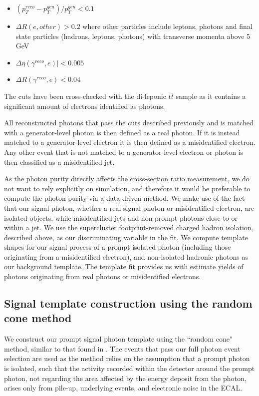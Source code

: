 \begin{itemize}
	\item $\left( p_T^{reco} - p_T^{gen} \right) /p_T^{gen} < 0.1$
	\item $\Delta R ( e, other ) > 0.2$ where other particles include leptons, photons and final state
		  particles (hadrons, leptons, photons) with transverse momenta above 5 GeV
	\item $ \Delta\eta ( \gamma^{reco}, e )| < 0.005$
	\item $\Delta R ( \gamma^{reco}, e ) < 0.04$
\end{itemize}

The cuts have been cross-checked with the di-leponic $t\bar{t}$ sample as it contains a significant amount of electrons identified as photons.

All reconstructed photons that pass the cuts described previously and is matched with a generator-level photon is then defined as a real photon. If it is instead matched to a generator-level electron it is then defined as a misidentified electron. Any other event that is not matched to a generator-level electron or photon is then classified as a misidentified jet.

As the photon purity directly affects the cross-section ratio measurement, we do not want to rely explicitly on simulation, and therefore it would be preferable to compute the photon purity via a data-driven method. We make use of the fact that our signal photon, whether a real signal photon or misidentified electron, are isolated objects, while misidentified jets and non-prompt photons close to or within a jet. We use the supercluster footprint-removed charged hadron isolation, described above, as our discriminating variable in the fit. We compute template shapes for our signal process of a prompt isolated photon (including those originating from a misidentified electron), and non-isolated hadronic photons as our background template. The template fit provides us with estimate yields of photons originating from real photons or misidentified electrons.   

\subsection{Signal template construction using the random cone method}

We construct our prompt signal photon template using the ``random cone" method, similar to that found in \cite{diffxsectdiphoton}. The events that pass our full photon event selection are used as the method relies on the assumption that a prompt photon is isolated, such that the activity recorded within the detector around the prompt photon, not regarding the area affected by the energy deposit from the photon, arises only from pile-up, underlying events, and electronic noise in the ECAL.  

